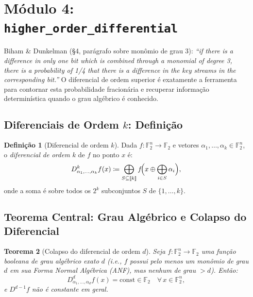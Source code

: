 \documentclass[12pt,a4paper]{article}
\newtheorem{theorem}{Teorema}[section]
\theoremstyle{definition}
\newtheorem{definition}[theorem]{Definição}
\theoremstyle{remark}
\newcommand{\GFtwo}{\mathbb{F}_2}
\newcommand{\xor}{\oplus}
\begin{document}
\section{Módulo 4: \texttt{higher\_order\_differential}}
\label{sec:higher2}

\begin{paperref}
  Biham \& Dunkelman (\S4, parágrafo sobre monômio de grau 3): \textit{``if
  there is a difference in only one bit which is combined through a monomial of
  degree 3, there is a probability of 1/4 that there is a difference in the
  key streams in the corresponding bit.''} O diferencial de ordem superior é
  exatamente a ferramenta para contornar esta probabilidade fracionária e
  recuperar informação determinística quando o grau algébrico é conhecido.
\end{paperref}

\subsection{Diferenciais de Ordem $k$: Definição}

\begin{definition}[Diferencial de ordem $k$]
  Dada $f : \GFtwo^n \to \GFtwo$ e vetores $\alpha_1, \ldots, \alpha_k \in
  \GFtwo^n$, o \emph{diferencial de ordem $k$} de $f$ no ponto $x$ é:
  \[
    D^k_{\alpha_1,\ldots,\alpha_k} f(x)
    \coloneqq \bigoplus_{S \subseteq [\![k]\!]} f\!\Bigl(x \xor
      \bigoplus_{i \in S} \alpha_i\Bigr),
  \]
  onde a soma é sobre todos os $2^k$ subconjuntos $S$ de $\{1,\ldots,k\}$.
\end{definition}

\subsection{Teorema Central: Grau Algébrico e Colapso do Diferencial}

\begin{theorem}[Colapso do diferencial de ordem $d$]
  \label{thm:collapse}
  Seja $f : \GFtwo^n \to \GFtwo$ uma função booleana de grau algébrico
  exato $d$ (i.e., $f$ possui pelo menos um monômio de grau $d$ em sua
  Forma Normal Algébrica (ANF), mas nenhum de grau $> d$). Então:
  \[
    D^d_{\alpha_1,\ldots,\alpha_d} f(x) = \text{const} \in \GFtwo
    \quad \forall\, x \in \GFtwo^n,
  \]
  e $D^{d-1} f$ não é constante em geral.
\end{theorem}
\end{document}
